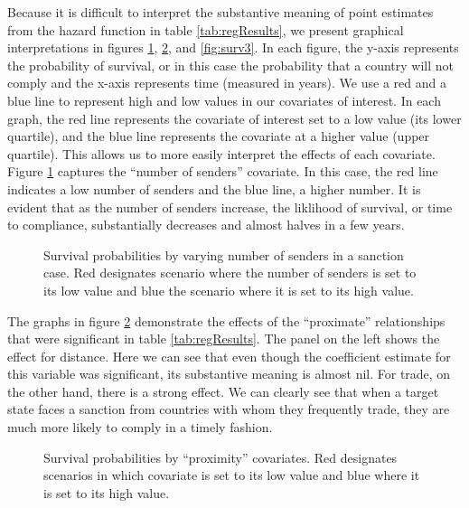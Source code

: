 Because it is difficult to interpret the substantive meaning of point estimates from the hazard function in table \ref{tab:regResults}, we present graphical interpretations in figures \ref{fig:surv1}, \ref{fig:surv2}, and \ref{fig:surv3}. In each figure, the y-axis represents the probability of survival, or in this case the probability that a country will not comply and the x-axis represents time (measured in years). We use a red and a blue line to represent high and low values in our covariates of interest. In each graph, the red line represents the covariate of interest set to a low value (its lower quartile), and the blue line represents the covariate at a higher value (upper quartile). This allows us to more easily interpret the effects of each covariate. Figure \ref{fig:surv1} captures the ``number of senders'' covariate. In this case, the red line indicates a low number of senders and the blue line, a higher number. It is evident that as the number of senders increase, the liklihood of survival, or time to compliance, substantially decreases and almost halves in a few years. 

\begin{figure}[ht]
	\centering
	\caption{Survival probabilities by varying number of senders in a sanction case. Red designates scenario where the number of senders is set to its low value and blue the scenario where it is set to its high value.}
	\resizebox{0.7\textwidth}{!}{}
	\label{fig:surv1}
\end{figure}
\FloatBarrier

The graphs in figure \ref{fig:surv2} demonstrate the effects of the ``proximate'' relationships that were significant in table \ref{tab:regResults}. The panel on the left shows the effect for distance. Here we can see that even though the coefficient estimate for this variable was significant, its substantive meaning is almost nil. For trade, on the other hand, there is a strong effect. We can clearly see that when a target state faces a sanction from countries with whom they frequently trade, they are much more likely to comply in a timely fashion.

\begin{figure}[ht]
	\centering
	\caption{Survival probabilities by ``proximity'' covariates. Red designates scenarios in which covariate is set to its low value and blue where it is set to its high value.}
	\resizebox{1\textwidth}{!}{}	
	\label{fig:surv2}
\end{figure}
\FloatBarrier

